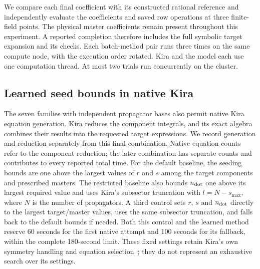 We compare each final coefficient with its constructed rational
reference and independently evaluate the coefficients and saved
row operations at three finite-field points. The physical master
coefficients remain present throughout this experiment.
A reported completion therefore includes the full symbolic target
expansion and its checks. Each batch-method pair runs three times
on the same compute node, with the execution order rotated.
Kira and the model each use one computation thread. At most two
trials run concurrently on the cluster.

\subsection{Learned seed bounds in native Kira}
The seven families with independent propagator bases also permit
native Kira equation generation. Kira reduces the component integrals,
and its exact algebra combines their results into the requested target
expressions. We record generation and reduction separately from this
final combination. Native equation counts refer to the component
reduction; the later combination has separate counts and contributes
to every reported total time. For the default baseline, the seeding bounds are
one above the largest values of $r$ and $s$ among the target components
and prescribed masters. The restricted baseline also bounds
$n_{\rm dot}$ one above its largest required value and uses Kira's
subsector truncation with $l=N-s_{\max}$, where $N$ is the number
of propagators. A third control sets $r$, $s$ and $n_{\rm dot}$ directly to the
largest target/master values, uses the same subsector truncation,
and falls back to the default bounds if needed. Both this control
and the learned method reserve 60 seconds for the first native attempt
and 100 seconds for its fallback, within the complete 180-second limit.
These fixed settings retain Kira's own symmetry
handling and equation selection~\cite{Kira3}; they do not represent
an exhaustive search over its settings.

